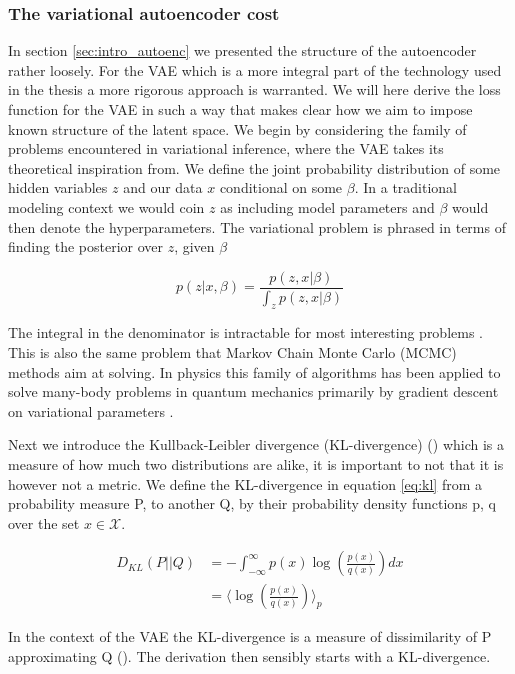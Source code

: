 \subsubsection*{The variational autoencoder cost}

In section \ref{sec:intro_autoenc} we presented the structure of the autoencoder rather loosely. For the VAE which is a more integral part of the technology used in the thesis a more rigorous approach is warranted. We will here derive the loss function for the VAE in such a way that makes clear how we aim to impose known structure of the latent space. We begin by considering the family of problems encountered in variational inference, where the VAE takes its theoretical inspiration from. We define the joint probability distribution of some hidden variables $z$ and our data $x$ conditional on some $\beta$. In a traditional modeling context we would coin $z$ as including model parameters and $\beta$ would then denote the hyperparameters. The variational problem is phrased in terms of finding the posterior over $z$, given $\beta$ 

\begin{equation}\label{eq:vbayes}
p(z | x, \beta) = \frac{p(z, x|\beta)}{\int_z p (z, x|\beta)}
\end{equation}

\noindent The integral in the denominator is intractable for most interesting problems . This is also the same problem that Markov Chain Monte Carlo (MCMC) methods aim at solving. In physics this family of algorithms has been applied to solve many-body problems in quantum mechanics primarily by gradient descent on variational parameters .

\noindent Next we introduce the Kullback-Leibler divergence (KL-divergence) (\cite{Kullback1951}) which is a measure of how much two distributions are alike, it is important to not that it is however not a metric. We define the KL-divergence in equation \ref{eq:kl} from a probability measure P, to another Q, by their probability density functions p, q over the set $x \in \mathcal{X}$. 

\begin{align}\label{eq:kl}
D_{KL} (P || Q) &= - \int^{\infty}_{-\infty} p(x) \log \left(\frac{p(x)}{q(x)}\right) dx \\
&= \langle \log \left(\frac{p(x)}{q(x)} \right)\rangle_{p}
\end{align}

\noindent In the context of the VAE the KL-divergence is a measure of dissimilarity of P approximating Q (\cite{Burnham2002}). The derivation then sensibly starts with a KL-divergence. \\

